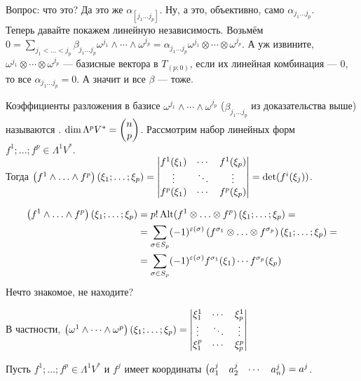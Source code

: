 \documentclass{article}
\begin{document}
\begin{itemize}
\begin{Proof}
$$            $$
            Вопрос: что это? Да это же $\alpha_{[j_1\ldots j_p]}$. Ну, а это, объективно, само $\alpha_{j_1\ldots j_p}$.\\
            Теперь давайте покажем линейную независимость. Возьмём $0=\sum\limits_{j_1<\ldots<j_p}\beta_{j_1\ldots j_p}\omega^{j_1}\land\cdots\land\omega^{j_p}=\alpha_{j_1\ldots j_p}\omega^{j_1}\otimes\cdots\otimes\omega^{j_p}$. А уж извините, $\omega^{j_1}\otimes\cdots\otimes\omega^{j_p}$ --- базисные вектора в $T_{(p;0)}$, если их линейная комбинация --- 0, то все $\alpha_{j_1\ldots j_p}=0$. А значит и все $\beta$ --- тоже.
        \end{Proof}
        \dfn Коэффициенты разложения в базисе $\omega^{j_1}\land\cdots\land\omega^{j_p}$ ($\beta_{j_1\ldots j_p}$ из доказательства выше) называются .
        \thm $\dim\Lambda^pV^*=\left(\begin{matrix}n\\p\end{matrix}\right)$.
        \thm Рассмотрим набор линейных форм $f^1;\ldots;f^p\in\Lambda^1V^*$.\\
        Тогда $\left(f^1\land\ldots\land f^p\right)\left(\xi_1;\ldots;\xi_p\right)=\left|\begin{matrix}f^1(\xi_1)&\cdots&f^1(\xi_p)\\\vdots&\ddots&\vdots\\f^p(\xi_1)&\cdots&f^p(\xi_p)\end{matrix}\right|=\det(f^i(\xi_j))$.
        \begin{Proof}
            \[
            \begin{split}
                \left(f^1\land\ldots\land f^p\right)\left(\xi_1;\ldots;\xi_p\right)&=p!\operatorname{Alt}(f^1\otimes\ldots\otimes f^p)\left(\xi_1;\ldots;\xi_p\right)=\\
                &=\sum\limits_{\sigma\in S_p}(-1)^{\varepsilon(\sigma)}\left(f^{\sigma_1}\otimes\ldots\otimes f^{\sigma_p}\right)\left(\xi_1;\ldots;\xi_p\right)=\\
                &=\sum\limits_{\sigma\in S_p}(-1)^{\varepsilon(\sigma)}f^{\sigma_1}(\xi_1)\cdots f^{\sigma_p}(\xi_p)
            \end{split}
            \]
            Нечто знакомое, не находите?
        \end{Proof}
        \begin{Example}
            В частности, $\left(\omega^1\land\cdots\land\omega^p\right)\left(\xi_1;\ldots;\xi_p\right)=\left|\begin{matrix}\xi^1_1&\cdots&\xi^1_p\\\vdots&\ddots&\vdots\\\xi^p_1&\cdots&\xi^p_p\end{matrix}\right|$
        \end{Example}
        \thm Пусть $f^1;\ldots;f^p\in\Lambda^1V^*$ и $f^j$ имеет координаты $\left(\begin{matrix}a^j_1&a^j_2&\cdots&a^j_n\end{matrix}\right)=a^j$.\\

\end{itemize}
\end{document}
